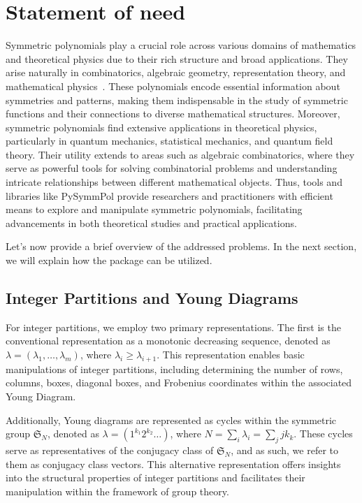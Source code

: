 \documentclass[a4paper,10pt]{amsart}
\begin{document}
\section{Statement of need}

Symmetric polynomials play a crucial role across various domains of
mathematics and theoretical physics due to their rich structure and
broad applications. They arise naturally in combinatorics, algebraic
geometry, representation theory, and mathematical
physics~\cite{Macdonald:1998, Fulton:2004, Babelon:2003,
  Korepin:1993, Marino:2005, Wheeler:2010}. These polynomials encode
essential information about symmetries and patterns, making them
indispensable in the study of symmetric functions and their
connections to diverse mathematical structures. Moreover, symmetric
polynomials find extensive applications in theoretical physics,
particularly in quantum mechanics, statistical mechanics, and quantum
field theory. Their utility extends to areas such as algebraic
combinatorics, where they serve as powerful tools for solving
combinatorial problems and understanding intricate relationships
between different mathematical objects. Thus, tools and libraries like
PySymmPol provide researchers and practitioners with efficient means
to explore and manipulate symmetric polynomials, facilitating
advancements in both theoretical studies and practical applications.
 
Let's now provide a brief overview of the addressed problems. In the
next section, we will explain how the package can be utilized.

\subsection{Integer Partitions and Young Diagrams}

For integer partitions, we employ two primary representations. The
first is the conventional representation as a monotonic decreasing
sequence, denoted as $\lambda = (\lambda_1, \dots, \lambda_m)$, where
$\lambda_i \geq \lambda_{i+1}$. This representation enables basic
manipulations of integer partitions, including determining the number
of rows, columns, boxes, diagonal boxes, and Frobenius coordinates
within the associated Young Diagram.

Additionally, Young diagrams are represented as cycles within the
symmetric group $\mathfrak{S}_N$, denoted as $\lambda = (1^{k_1}
2^{k_2} \dots)$, where $N = \sum_i\lambda_i = \sum_j j k_k$. These
cycles serve as representatives of the conjugacy class of
$\mathfrak{S}_N$, and as such, we refer to them as conjugacy class
vectors. This alternative representation offers insights into the
structural properties of integer partitions and facilitates their
manipulation within the framework of group theory.
\end{document}

